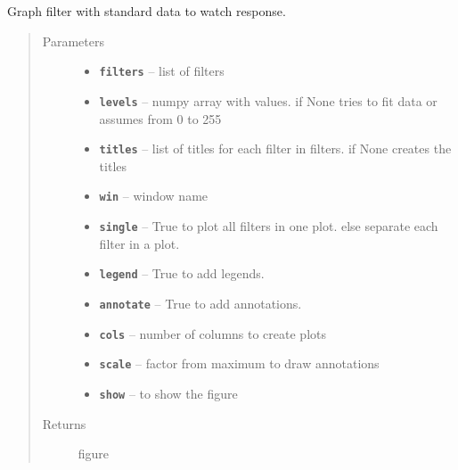 \documentclass[letterpaper,10pt,english]{sphinxmanual}
\begin{document}
\begin{fulllineitems}
\label{RRtoolbox.lib:RRtoolbox.lib.plotter.graph_filter}
Graph filter with standard data to watch response.
\begin{quote}\begin{description}
\item[{Parameters}] \leavevmode\begin{itemize}
\item {} 
\textbf{\texttt{filters}} -- list of filters

\item {} 
\textbf{\texttt{levels}} -- numpy array with values. if None tries to fit data or assumes from 0 to 255

\item {} 
\textbf{\texttt{titles}} -- list of titles for each filter in filters. if None creates the titles

\item {} 
\textbf{\texttt{win}} -- window name

\item {} 
\textbf{\texttt{single}} -- True to plot all filters in one plot. else separate each filter in a plot.

\item {} 
\textbf{\texttt{legend}} -- True to add legends.

\item {} 
\textbf{\texttt{annotate}} -- True to add annotations.

\item {} 
\textbf{\texttt{cols}} -- number of columns to create plots

\item {} 
\textbf{\texttt{scale}} -- factor from maximum to draw annotations

\item {} 
\textbf{\texttt{show}} -- to show the figure

\end{itemize}

\item[{Returns}] \leavevmode
figure

\end{description}\end{quote}

\end{fulllineitems}
\end{document}
